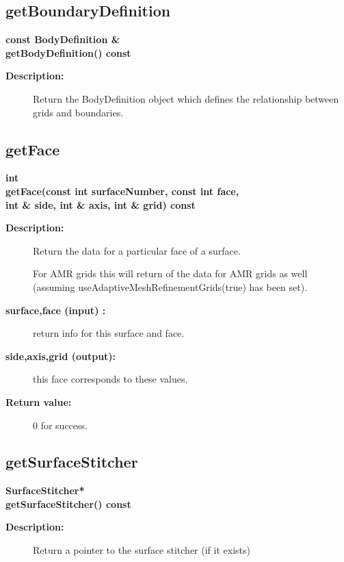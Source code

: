 \subsection{getBoundaryDefinition}
 
\begin{flushleft} \textbf{%
const BodyDefinition \&  \\ 
\settowidth{\IntegrateIncludeArgIndent}{getBodyDefinition(}%
getBodyDefinition() const
}\end{flushleft}
\begin{description}
\item[{\bf Description:}] 
    Return the BodyDefinition object which defines the relationship between grids and boundaries.
\end{description}
\subsection{getFace}
 
\begin{flushleft} \textbf{%
int  \\ 
\settowidth{\IntegrateIncludeArgIndent}{getFace(}%
getFace(const int surfaceNumber, const int face, \\ 
\hspace{\IntegrateIncludeArgIndent}int \& side, int \& axis, int \& grid) const
}\end{flushleft}
\begin{description}
\item[{\bf Description:}] 
    Return the data for a particular face of a surface.

  For AMR grids this will return of the data for AMR grids as well (assuming
    useAdaptiveMeshRefinementGrids(true) has been set).

\item[{\bf surface,face (input) :}]  return info for this surface and face.
\item[{\bf side,axis,grid (output):}]  this face corresponds to these values.
\item[{\bf Return value:}]  0 for success.
\end{description}
\subsection{getSurfaceStitcher}
 
\begin{flushleft} \textbf{%
SurfaceStitcher*  \\ 
\settowidth{\IntegrateIncludeArgIndent}{getSurfaceStitcher(}%
getSurfaceStitcher() const
}\end{flushleft}
\begin{description}
\item[{\bf Description:}] 
    Return a pointer to the surface stitcher (if it exists)
\end{description}
